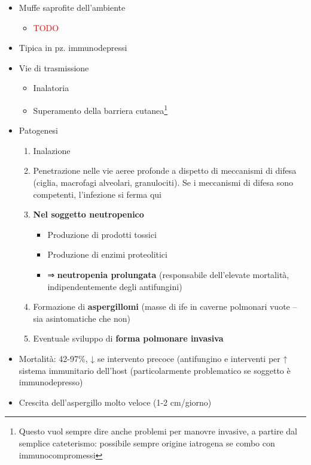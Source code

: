 \documentclass[italian,]{article}
\providecommand{\tightlist}{%
  \setlength{\itemsep}{0pt}\setlength{\parskip}{0pt}}
\newcommand{\TODO}[1]{\textcolor{red}{\textsf{\footnotesize{TODO #1}}}} %
\begin{document}
\begin{itemize}
\tightlist
\item
  Muffe saprofite dell'ambiente

  \begin{itemize}
  \item
    \TODO{}
  \end{itemize}
\item
  Tipica in pz. immunodepressi
\item
  Vie di trasmissione

  \begin{itemize}
  \tightlist
  \item
    Inalatoria
  \item
    Superamento della barriera cutanea\footnote{Questo vuol sempre dire
      anche problemi per manovre invasive, a partire dal semplice
      cateterismo: possibile sempre origine iatrogena se combo con
      immunocompromessi}
  \end{itemize}
\item
  Patogenesi

  \begin{enumerate}
  \def\labelenumi{\arabic{enumi}.}
  \setcounter{enumi}{-1}
  \tightlist
  \item
    Inalazione
  \item
    Penetrazione nelle vie aeree profonde a dispetto di meccanismi di
    difesa (ciglia, macrofagi alveolari, granulociti). Se i meccanismi
    di difesa sono competenti, l'infezione si ferma qui
  \item
    \textbf{Nel soggetto neutropenico}

    \begin{itemize}
    \tightlist
    \item
      Produzione di prodotti tossici
    \item
      Produzione di enzimi proteolitici
    \item
      ⇒ \textbf{neutropenia prolungata} (responsabile dell'elevate
      mortalità, indipendentemente degli antifungini)
    \end{itemize}
  \item
    Formazione di \textbf{aspergillomi} (masse di ife in caverne
    polmonari vuote -- sia asintomatiche che non)
  \item
    Eventuale sviluppo di \textbf{forma polmonare invasiva}
  \end{enumerate}
\item
  Mortalità: 42-97\%, ↓ se intervento precoce (antifungino e interventi
  per ↑ sistema immunitario dell'host (particolarmente problematico se
  soggetto è immunodepresso)
\item
  Crescita dell'aspergillo molto veloce (1-2 cm/giorno)


\end{itemize}
\end{document}

